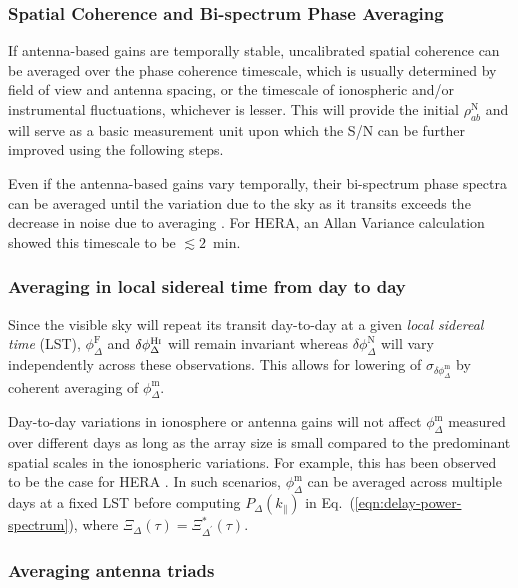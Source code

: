 \documentclass[
reprint,
superscriptaddress,
amsmath,
amssymb,
aps,
prd
]{revtex4-1}
\begin{document}
\subsubsection{Spatial Coherence and Bi-spectrum Phase  Averaging}\label{sec:vis-avg}

If antenna-based gains are temporally stable, uncalibrated spatial coherence can be averaged over the phase coherence timescale, which is usually determined by field of view and antenna spacing, or the timescale of ionospheric and/or instrumental fluctuations, whichever is lesser. %
This will provide the initial $\rho_{ab}^\textrm{N}$ and will serve as a basic measurement unit upon which the S/N can be further improved using the following steps. 

Even if the antenna-based gains vary temporally, their bi-spectrum phase spectra can be averaged until the variation due to the sky as it transits exceeds the decrease in noise due to averaging \cite{car18}. For HERA, an Allan Variance calculation showed this timescale to be $\lesssim 2$~min. 

\subsubsection{Averaging in local sidereal time from day to day}\label{sec:lst-avg}

Since the visible sky will repeat its transit day-to-day at a given {\it local sidereal time} (LST), $\phi_\Delta^\textrm{F}$ and $\delta\phi_\Delta^\textrm{H{\sc i}}$ will remain invariant whereas $\delta\phi_\Delta^\textrm{N}$ will vary independently across these observations. This allows for lowering of $\sigma_{\delta\phi_\Delta^\textrm{m}}$ by coherent averaging of $\phi_\Delta^\textrm{m}$.

Day-to-day variations in ionosphere or antenna gains will not affect $\phi_\Delta^\textrm{m}$ measured over different days as long as the array size is small compared to the predominant spatial scales in the ionospheric variations. For example, this has been observed to be the case for HERA \cite{car18}. In such scenarios, $\phi_\Delta^\textrm{m}$ can be averaged across multiple days at a fixed LST before computing $P_\Delta(k_\parallel)$ in Eq.~(\ref{eqn:delay-power-spectrum}), where $\Xi_\Delta(\tau)=\Xi_{\Delta^\prime}^*(\tau)$. 

\subsubsection{Averaging antenna triads}\label{sec:triad-avg}
\end{document}
